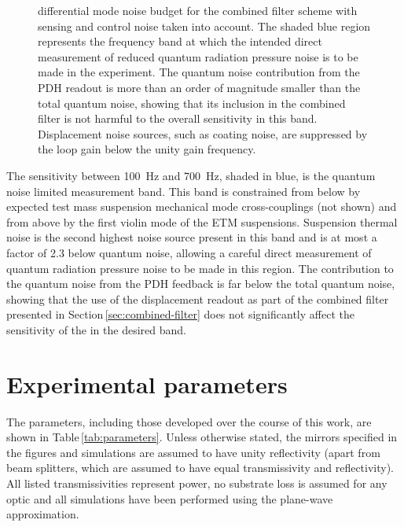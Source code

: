 \begin{figure}
  
  \caption[Control noise budget for the \SSMEXPT{}]{\label{fig:noise-budget}\SSM{} differential mode noise budget for the combined filter scheme with sensing and control noise taken into account. The shaded blue region represents the frequency band at which the intended direct measurement of reduced quantum radiation pressure noise is to be made in the experiment. The quantum noise contribution from the \gls{PDH} readout is more than an order of magnitude smaller than the total quantum noise, showing that its inclusion in the combined filter is not harmful to the overall sensitivity in this band. Displacement noise sources, such as coating noise, are suppressed by the loop gain below the unity gain frequency.}
\end{figure}

The sensitivity between \SI{100}{\hertz} and \SI{700}{\hertz}, shaded in blue, is the quantum noise limited measurement band. This band is constrained from below by expected test mass suspension mechanical mode cross-couplings (not shown) and from above by the first violin mode of the \gls{ETM} suspensions. Suspension thermal noise is the second highest noise source present in this band and is at most a factor of \SI{2.3}{} below quantum noise, allowing a careful direct measurement of quantum radiation pressure noise to be made in this region. The contribution to the quantum noise from the \gls{PDH} feedback is far below the total quantum noise, showing that the use of the displacement readout as part of the combined filter presented in Section\,\ref{sec:combined-filter} does not significantly affect the sensitivity of the \SSM{} in the desired band.

\section{\label{sec:control-parameters}Experimental parameters}
The parameters, including those developed over the course of this work, are shown in Table\,\ref{tab:parameters}. Unless otherwise stated, the mirrors specified in the figures and simulations are assumed to have unity reflectivity (apart from beam splitters, which are assumed to have equal transmissivity and reflectivity). All listed transmissivities represent power, no substrate loss is assumed for any optic and all simulations have been performed using the plane-wave approximation.

